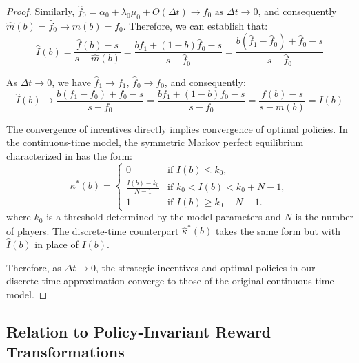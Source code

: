 \begin{proof}
        Similarly, $\hat{f}_0 = \alpha_0 + \lambda_0\mu_0 + O(\Delta t) \to f_0 \text{ as } \Delta t \to 0$, and consequently $\hat{m}(b) = \hat{f}_0 \to m(b) = f_0$.
        Therefore, we can establish that:
        \begin{equation}
            \hat{I}(b) = \frac{\hat{f}(b) - s}{s - \hat{m}(b)} = \frac{b \hat{f}_1 + (1-b) \hat{f}_0 - s}{s - \hat{f}_0} = \frac{b(\hat{f}_1 - \hat{f}_0) + \hat{f}_0 - s}{s - \hat{f}_0}
        \end{equation}

        As $\Delta t \to 0$, we have $\hat{f}_1 \to f_1$, $\hat{f}_0 \to f_0$, and consequently:
        \begin{equation}
            \hat{I}(b) \to \frac{b(f_1 - f_0) + f_0 - s}{s - f_0} = \frac{b f_1 + (1-b) f_0 - s}{s - f_0} = \frac{f(b) - s}{s - m(b)} = I(b)
        \end{equation}

        The convergence of incentives directly implies convergence of optimal policies. In the continuous-time model, the symmetric Markov perfect equilibrium characterized in \citet{keller2020undiscounted} has the form:
        \begin{equation}
            \kappa^*(b) =
            \begin{cases}
                0                    & \text{if } I(b) \leq k_0,            \\
                \frac{I(b)-k_0}{N-1} & \text{if } k_0 < I(b) < k_0 + N - 1, \\
                1                    & \text{if } I(b) \geq k_0 + N - 1.
            \end{cases}
        \end{equation}
        where $k_0$ is a threshold determined by the model parameters and $N$ is the number of players. The discrete-time counterpart $\hat{\kappa}^*(b)$ takes the same form but with $\hat{I}(b)$ in place of $I(b)$.

        Therefore, as $\Delta t \to 0$, the strategic incentives and optimal policies in our discrete-time approximation converge to those of the original continuous-time model.
    \end{proof}

\fi
\subsection{Relation to Policy-Invariant Reward Transformations}
\label{appendix:policy_invariance}


